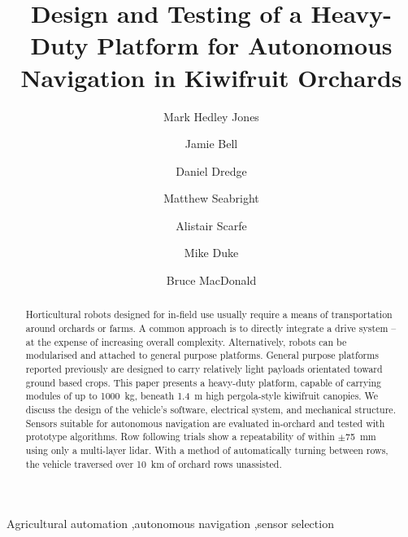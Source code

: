 \documentclass[preprint,authoryear,12pt]{elsarticle}
\begin{document}
\begin{frontmatter}

\title{Design and Testing of a Heavy-Duty Platform for Autonomous Navigation in Kiwifruit Orchards}

\author[UoW]{Mark Hedley Jones}

\author[UoA]{Jamie Bell}
\author[UoW]{Daniel Dredge}
\author[UoW]{Matthew Seabright}
\author[RPL]{Alistair Scarfe}
\author[UoW]{Mike Duke}
\author[UoA]{Bruce MacDonald}
\address[UoW]{School of Engineering, University of Waikato, Hamilton, New Zealand}
\address[UoA]{Faculty of Engineering, University of Auckland, Auckland, New Zealand}
\address[RPL]{Robotics Plus Ltd, Newnham Innovation Park, Tauranga, New Zealand}

\begin{abstract}
    Horticultural robots designed for in-field use usually require a means of transportation around orchards or farms.
    A common approach is to directly integrate a drive system -- at the expense of increasing overall complexity.
    Alternatively, robots can be modularised and attached to general purpose platforms.
    General purpose platforms reported previously are designed to carry relatively light payloads orientated toward ground based crops.
    This paper presents a heavy-duty platform, capable of carrying modules of up to \SI{1000}{\kilo\gram}, beneath \SI{1.4}{\meter} high pergola-style kiwifruit canopies.
    We discuss the design of the vehicle's software, electrical system, and mechanical structure.
    Sensors suitable for autonomous navigation are evaluated in-orchard and tested with prototype algorithms.
    Row following trials show a repeatability of within $\pm$\SI{75}{\milli\meter} using only a multi-layer lidar.
    With a method of automatically turning between rows, the vehicle traversed over \SI{10}{\kilo\meter} of orchard rows unassisted.
\end{abstract}

\begin{keyword}
    Agricultural automation \sep autonomous navigation \sep sensor selection
\end{keyword}

\end{frontmatter}


\begin{table}
  \small
   \begin{framed}
     \printnomenclature
   \end{framed}
\end{table}
\end{document}
